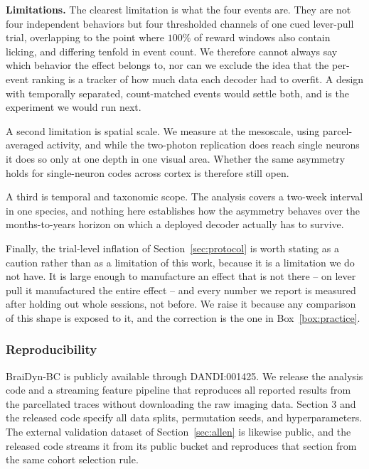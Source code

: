 \documentclass{article}
\begin{document}
\textbf{Limitations.} The clearest limitation is what the four events are. They are not four
independent behaviors but four thresholded channels of one cued lever-pull trial, overlapping to the
point where $100\%$ of reward windows also contain licking, and differing tenfold in event count. We
therefore cannot always say which behavior the effect belongs to, nor can we exclude the idea that
the per-event ranking is a tracker of how much data each decoder had to overfit. A design with
temporally separated, count-matched events would settle both, and is the experiment we would run
next.

A second limitation is spatial scale. We measure at the mesoscale, using parcel-averaged activity,
and while the two-photon replication does reach single neurons it does so only at one depth in one
visual area. Whether the same asymmetry holds for single-neuron codes across cortex is therefore
still open.

A third is temporal and taxonomic scope. The analysis covers a two-week interval in one species, and
nothing here establishes how the asymmetry behaves over the months-to-years horizon on which a
deployed decoder actually has to survive.

Finally, the trial-level inflation of Section~\ref{sec:protocol} is worth stating as a caution
rather than as a limitation of this work, because it is a limitation we do not have. It is large
enough to manufacture an effect that is not there -- on lever pull it manufactured the entire effect
-- and every number we report is measured after holding out whole sessions, not before. We raise it
because any comparison of this shape is exposed to it, and the correction is the one in
Box~\ref{box:practice}.


\subsubsection*{Reproducibility}
BraiDyn-BC is publicly available through DANDI:001425. We release the analysis code and a streaming
feature pipeline that reproduces all reported results from the parcellated traces without downloading
the raw imaging data. Section 3 and the released code specify all data splits, permutation seeds, and
hyperparameters. The external validation dataset of Section~\ref{sec:allen} is likewise public, and
the released code streams it from its public bucket and reproduces that section from the same cohort
selection rule.
\end{document}
